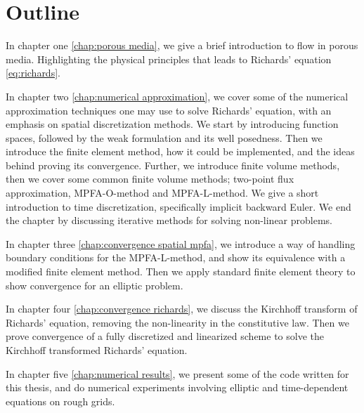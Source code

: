 \documentclass[../Main/main.tex]{subfiles}
\begin{document}
\section*{Outline}
In chapter one \ref{chap:porous media}, we give a brief introduction to flow in porous media. Highlighting the physical principles that leads to Richards' equation \eqref{eq:richards}.
\par 
In chapter two \ref{chap:numerical approximation}, we cover some of the numerical approximation techniques one may use to solve Richards' equation, with an emphasis on spatial discretization methods. We start by introducing function spaces, followed by the weak formulation and its well posedness. Then we introduce the finite element method, how it could be implemented, and the ideas behind proving its convergence. Further, we introduce finite volume methods, then we cover some common finite volume methods; two-point flux approximation, MPFA-O-method and MPFA-L-method. We give a short introduction to time discretization, specifically implicit backward Euler. We end the chapter by discussing iterative methods for solving non-linear problems.
\par
In chapter three \ref{chap:convergence spatial mpfa}, we introduce a way of handling boundary conditions for the MPFA-L-method, and show its equivalence with a modified finite element method. Then we apply standard finite element theory to show convergence for an elliptic problem.
\par 
In chapter four \ref{chap:convergence richards}, we discuss the Kirchhoff transform of Richards' equation, removing the non-linearity in the constitutive law. Then we prove convergence of a fully discretized and linearized scheme to solve the Kirchhoff transformed Richards' equation.
\par 
In chapter five \ref{chap:numerical results}, we present some of the code written for this thesis, and do numerical experiments involving elliptic and time-dependent equations on rough grids.
\end{document}
